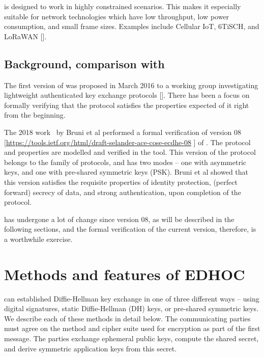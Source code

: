 \mEdhoc is designed to work in highly constrained scenarios. This makes it especially suitable for network technologies which have low throughput, low power consumption, and small frame sizes. Examples include Cellular IoT, 6TiSCH, and LoRaWAN [\mcneed].


\subsection{Background, comparison with~\cite{DBLP:conf/secsr/BruniJPS18}}
The first version of \mEdhoc was proposed in March 2016 to a working group investigating lightweight authenticated key exchange protocols [\mcneed]. There has been a focus on formally verifying that the protocol satisfies the properties expected of it right from the beginning. 

The 2018 work~\cite{DBLP:conf/secsr/BruniJPS18} by Bruni et al performed a formal verification of version 08 [\url{https://tools.ietf.org/html/draft-selander-ace-cose-ecdhe-08} \mcfix] of \mEdhoc. The protocol and properties are modelled and verified in the \mProverif tool. This version of the protocol belongs to the \mSigmaI family of protocols, and has two modes -- one with asymmetric keys, and one with pre-shared symmetric keys (PSK). Bruni et al showed that this version satisfies the requisite properties of identity protection, (perfect forward) secrecy of data, and strong authentication, upon completion of the protocol.

\mEdhoc has undergone a lot of change since version 08, as will be described in the following sections, and the formal verification of the current version, therefore, is a worthwhile exercise.

\section{Methods and features of \textsc{EDHOC}}
\mEdhoc can established Diffie-Hellman key exchange in one of three different ways -- using digital signatures, static Diffie-Hellman (DH) keys, or pre-shared symmetric keys. We describe each of these methods in detail below. The communicating parties must agree on the method and cipher suite used for encryption as part of the first message. The parties exchange ephemeral public keys, compute the shared secret, and derive symmetric application keys from this secret.

